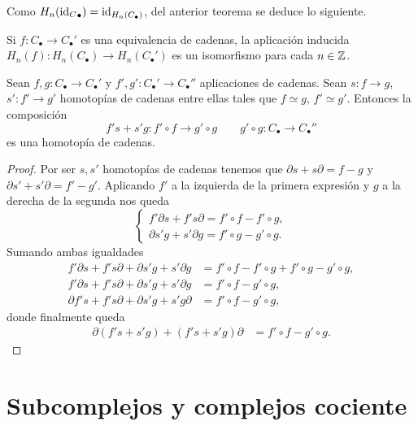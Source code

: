 Como $H_n({\operatorname{id}_C}_{\bullet}) = \operatorname{id}_{H_n(C_{\bullet})}$, del anterior teorema se deduce lo siguiente.

\begin{corolario}
	\label{cor:equiv-homot}
	Si $f: C_{\bullet} \rightarrow C_{\bullet}'$ es una equivalencia de cadenas, la aplicación inducida $H_n(f): H_n(C_{\bullet}) \rightarrow H_n(C_{\bullet}')$ es un isomorfismo para cada $n \in \mathbb{Z}$.
\end{corolario}

\begin{proposicion}
	Sean $f,g: C_{\bullet} \rightarrow C_{\bullet}'$ y $f',g': C_{\bullet}' \rightarrow C_{\bullet}''$ aplicaciones de cadenas. Sean $s: f \rightarrow g$, $s': f' \rightarrow g'$ homotopías de cadenas entre ellas tales que $f \simeq g$, $f' \simeq g'$. Entonces la composición
	\[ f' s + s' g: f' \circ f \rightarrow g' \circ g \qquad g' \circ g : C_{\bullet} \rightarrow C_{\bullet}'' \]
	es una homotopía de cadenas.
\end{proposicion}
\begin{proof}
	Por ser $s,s'$ homotopías de cadenas tenemos que $\partial s + s\partial = f-g$ y $\partial s' + s'\partial = f'-g'$. Aplicando  $f'$ a la izquierda de la primera expresión y $g$ a la derecha de la segunda nos queda
	\begin{equation}
		\begin{cases}
			 f'\partial s + f's\partial = f' \circ f-f' \circ g, \\
			 \partial s' g + s'\partial g = f' \circ g-g' \circ g.
		\end{cases}
	\end{equation}
	Sumando ambas igualdades
	\begin{align*}
		f'\partial s + f's\partial + \partial s' g + s'\partial g &= f' \circ f-f' \circ g + f' \circ g-g' \circ g, \\
		f'\partial s + f's\partial + \partial s' g + s'\partial g &= f' \circ f - g' \circ g, \\ 
		\partial f' s + f's \partial + \partial s' g + s' g \partial &= f' \circ f - g' \circ g,
	\end{align*}
	donde finalmente queda
	\begin{align*}
		\partial (f' s + s' g) + (f's + s' g) \partial &= f' \circ f - g' \circ g .
	\end{align*}
\end{proof}

\section{Subcomplejos y complejos cociente}

